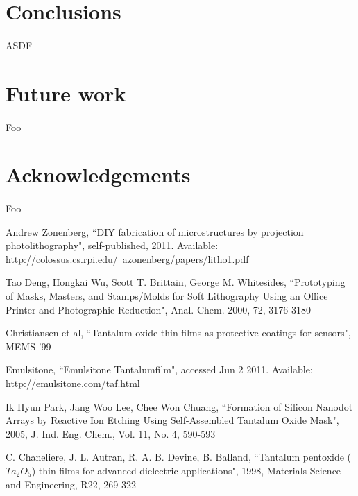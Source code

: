 \documentclass[twocolumn]{article}
\begin{document}
\section{Conclusions}
\paragraph*{}
ASDF

\section{Future work}
\paragraph*{}
Foo

\section{Acknowledgements}
\paragraph*{}
Foo

\begin{thebibliography}{99}
	Andrew Zonenberg, ``DIY fabrication of microstructures by projection photolithography",
	self-published, 2011. Available: http://colossus.cs.rpi.edu/~azonenberg/papers/litho1.pdf

	Tao Deng, Hongkai Wu, Scott T. Brittain, George M. Whitesides, ``Prototyping of Masks, Masters,
	and Stamps/Molds for Soft Lithography Using an Office Printer and Photographic Reduction",
	Anal. Chem. 2000, 72, 3176-3180
	
	Christiansen et al, ``Tantalum oxide thin films as protective coatings for sensors", MEMS '99

	Emulsitone, ``Emulsitone Tantalumfilm", accessed Jun 2 2011. Available:
	http://emulsitone.com/taf.html
	
	Ik Hyun Park, Jang Woo Lee, Chee Won Chuang, ``Formation of Silicon Nanodot Arrays by Reactive
	Ion Etching Using Self-Assembled Tantalum Oxide Mask", 2005, J. Ind. Eng. Chem., Vol. 11, No. 4,
	590-593
	
	C. Chaneliere, J. L. Autran, R. A. B. Devine, B. Balland, ``Tantalum pentoxide ($Ta_2O_5$) thin
	films for advanced dielectric applications", 1998, Materials Science and Engineering, R22,
	269-322

\end{thebibliography}
\end{document}
